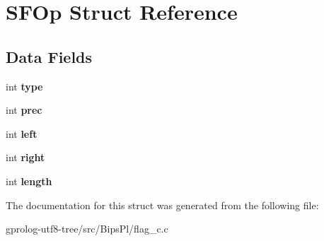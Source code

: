 \hypertarget{structSFOp}{}\section{S\+F\+Op Struct Reference}
\label{structSFOp}
\subsection*{Data Fields}
\begin{DoxyCompactItemize}
\item 
int {\bfseries type}\hypertarget{structSFOp_a2edfc96ff91474523b5bda2185158ffa}{}\label{structSFOp_a2edfc96ff91474523b5bda2185158ffa}

\item 
int {\bfseries prec}\hypertarget{structSFOp_ae4c13ff3ed16b56c55f822e84b9db21a}{}\label{structSFOp_ae4c13ff3ed16b56c55f822e84b9db21a}

\item 
int {\bfseries left}\hypertarget{structSFOp_adc97e181b0efdcff6b921b82979ab80f}{}\label{structSFOp_adc97e181b0efdcff6b921b82979ab80f}

\item 
int {\bfseries right}\hypertarget{structSFOp_a53d1624dfd48f82123f055f8578646e7}{}\label{structSFOp_a53d1624dfd48f82123f055f8578646e7}

\item 
int {\bfseries length}\hypertarget{structSFOp_a3b91d02ed1a1a1c664a3cfb062e60ed1}{}\label{structSFOp_a3b91d02ed1a1a1c664a3cfb062e60ed1}

\end{DoxyCompactItemize}


The documentation for this struct was generated from the following file\+:\begin{DoxyCompactItemize}
\item 
gprolog-\/utf8-\/tree/src/\+Bips\+Pl/flag\+\_\+c.\+c\end{DoxyCompactItemize}
